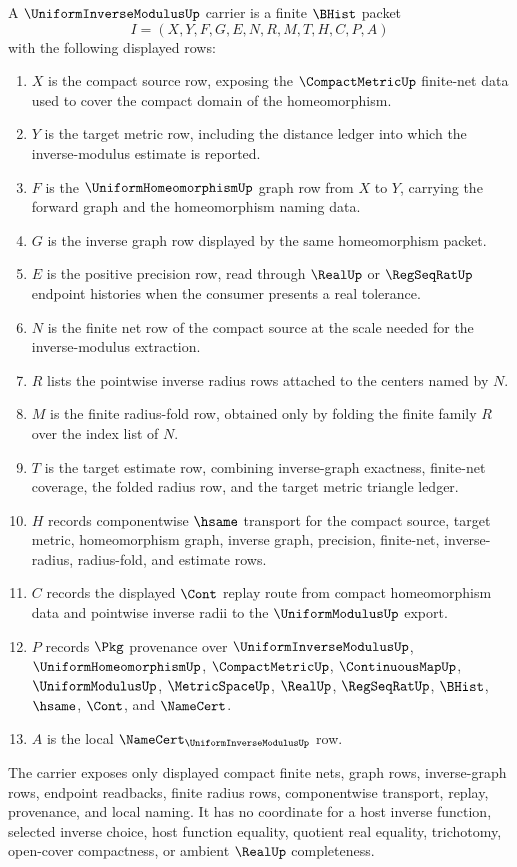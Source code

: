 \begin{definition}
\label{def:uniform-inverse-modulus-carrier}
A $\UniformInverseModulusUp$ carrier is a finite $\BHist$ packet
$$
I=(X,Y,F,G,E,N,R,M,T,H,C,P,A)
$$
with the following displayed rows:
\begin{enumerate}
\item $X$ is the compact source row, exposing the $\CompactMetricUp$ finite-net data used to cover the compact domain of the homeomorphism.
\item $Y$ is the target metric row, including the distance ledger into which the inverse-modulus estimate is reported.
\item $F$ is the $\UniformHomeomorphismUp$ graph row from $X$ to $Y$, carrying the forward graph and the homeomorphism naming data.
\item $G$ is the inverse graph row displayed by the same homeomorphism packet.
\item $E$ is the positive precision row, read through $\RealUp$ or $\RegSeqRatUp$ endpoint histories when the consumer presents a real tolerance.
\item $N$ is the finite net row of the compact source at the scale needed for the inverse-modulus extraction.
\item $R$ lists the pointwise inverse radius rows attached to the centers named by $N$.
\item $M$ is the finite radius-fold row, obtained only by folding the finite family $R$ over the index list of $N$.
\item $T$ is the target estimate row, combining inverse-graph exactness, finite-net coverage, the folded radius row, and the target metric triangle ledger.
\item $H$ records componentwise $\hsame$ transport for the compact source, target metric, homeomorphism graph, inverse graph, precision, finite-net, inverse-radius, radius-fold, and estimate rows.
\item $C$ records the displayed $\Cont$ replay route from compact homeomorphism data and pointwise inverse radii to the $\UniformModulusUp$ export.
\item $P$ records $\Pkg$ provenance over $\UniformInverseModulusUp$, $\UniformHomeomorphismUp$, $\CompactMetricUp$, $\ContinuousMapUp$, $\UniformModulusUp$, $\MetricSpaceUp$, $\RealUp$, $\RegSeqRatUp$, $\BHist$, $\hsame$, $\Cont$, and $\NameCert$.
\item $A$ is the local $\NameCert_{\UniformInverseModulusUp}$ row.
\end{enumerate}
The carrier exposes only displayed compact finite nets, graph rows, inverse-graph rows, endpoint readbacks, finite radius rows, componentwise transport, replay, provenance, and local naming. It has no coordinate for a host inverse function, selected inverse choice, host function equality, quotient real equality, trichotomy, open-cover compactness, or ambient $\RealUp$ completeness.
\end{definition}

